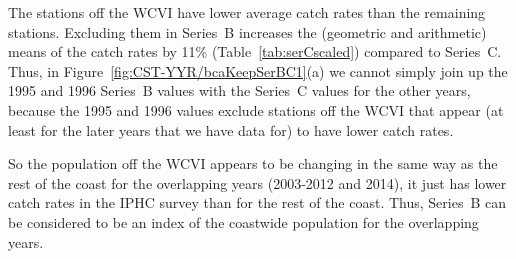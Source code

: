 The stations off the WCVI have lower average catch rates than the remaining
stations. Excluding them in Series~B increases the (geometric and arithmetic)
means of the catch rates by 11\% (Table~\ref{tab:serCscaled}) compared to
Series~C. Thus, in Figure~\ref{fig:CST-YYR/bcaKeepSerBC1}(a) we cannot simply
join up the 1995 and 1996 Series~B values with the Series~C values for the other
years, because the 1995 and 1996 values exclude stations off the WCVI that
appear (at least for the later years that we have data for) to have lower catch
rates.

So the population off the WCVI appears to be changing in the same way as the
rest of the coast for the overlapping years (2003-2012 and 2014), it just has
lower catch rates in the IPHC survey than for the rest of the coast. Thus,
Series~B can be considered to be an index of the coastwide population for the
overlapping years.


